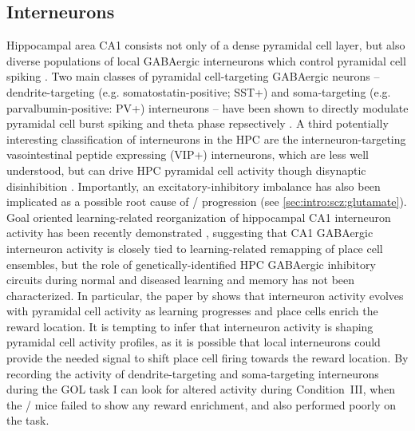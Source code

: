 \subsection{Interneurons}
Hippocampal area CA1 consists not only of a dense pyramidal cell layer, but also diverse populations of local GABAergic interneurons which control pyramidal cell spiking \citep{Freund1996}.
Two main classes of pyramidal cell-targeting GABAergic neurons -- dendrite-targeting (e.g. somatostatin-positive; SST+) and soma-targeting (e.g. parvalbumin-positive: PV+) interneurons -- have been shown to directly modulate pyramidal cell burst spiking and theta phase repsectively \citep{Royer2012}\citep{Lovett-Barron2012}.
A third potentially interesting classification of interneurons in the \ac{HPC} are the interneuron-targeting vasointestinal peptide expressing (VIP+) interneurons, which are less well understood, but can drive \ac{HPC} pyramidal cell activity though disynaptic disinhibition \citep{Chamberland2012}.
Importantly, an excitatory-inhibitory imbalance has also been implicated as a possible root cause of \scz/ progression (see \autoref{sec:intro:scz:glutamate}).
Goal oriented learning-related reorganization of hippocampal CA1 interneuron activity has been recently demonstrated \citep{Dupret2013}, suggesting that CA1 GABAergic interneuron activity is closely tied to learning-related remapping of place cell ensembles, but the role of genetically-identified \ac{HPC} GABAergic inhibitory circuits during normal and diseased learning and memory has not been characterized.
In particular, the paper by \citeauthor{Dupret2013} shows that interneuron activity evolves with pyramidal cell activity as learning progresses and place cells enrich the reward location.
It is tempting to infer that interneuron activity is shaping pyramidal cell activity profiles, as it is possible that local interneurons could provide the needed signal to shift place cell firing towards the reward location.
By recording the activity of dendrite-targeting and soma-targeting interneurons during the \ac{GOL} task I can look for altered activity during Condition~III, when the \df/ mice failed to show any reward enrichment, and also performed poorly on the task.

